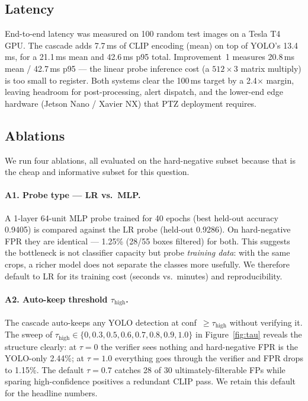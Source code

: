 \documentclass{article}
\begin{document}
\subsection{Latency}

End-to-end latency was measured on 100 random test images on a Tesla T4 GPU.
The cascade adds 7.7\,ms of CLIP encoding (mean) on top of YOLO's 13.4\,ms,
for a 21.1\,ms mean and 42.6\,ms p95 total. Improvement~1 measures
20.8\,ms mean / 42.7\,ms p95 --- the linear probe inference cost (a
$512{\times}3$ matrix multiply) is too small to register. Both systems
clear the 100\,ms target by a 2.4$\times$ margin, leaving headroom for
post-processing, alert dispatch, and the lower-end edge hardware (Jetson
Nano / Xavier NX) that PTZ deployment requires.

\subsection{Ablations}
\label{sec:ablations}

We run four ablations, all evaluated on the hard-negative subset because
that is the cheap and informative subset for this question.

\paragraph{A1. Probe type --- LR vs.\ MLP.}
A 1-layer 64-unit MLP probe trained for 40 epochs (best held-out accuracy
0.9405) is compared against the LR probe (held-out 0.9286). On hard-negative
FPR they are identical --- 1.25\% (28/55 boxes filtered) for both. This
suggests the bottleneck is not classifier capacity but probe \emph{training
data}: with the same crops, a richer model does not separate the classes
more usefully. We therefore default to LR for its training cost
(seconds vs.\ minutes) and reproducibility.

\paragraph{A2. Auto-keep threshold $\tau_{\text{high}}$.}
The cascade auto-keeps any YOLO detection at conf~$\geq \tau_{\text{high}}$
without verifying it. The sweep of $\tau_{\text{high}}\in\{0,0.3,0.5,0.6,0.7,
0.8,0.9,1.0\}$ in Figure~\ref{fig:tau} reveals the structure clearly: at
$\tau{=}0$ the verifier sees nothing and hard-negative FPR is the YOLO-only
2.44\%; at $\tau{=}1.0$ everything goes through the verifier and FPR drops
to 1.15\%. The default $\tau{=}0.7$ catches 28 of 30 ultimately-filterable
FPs while sparing high-confidence positives a redundant CLIP pass. We retain
this default for the headline numbers.
\end{document}
